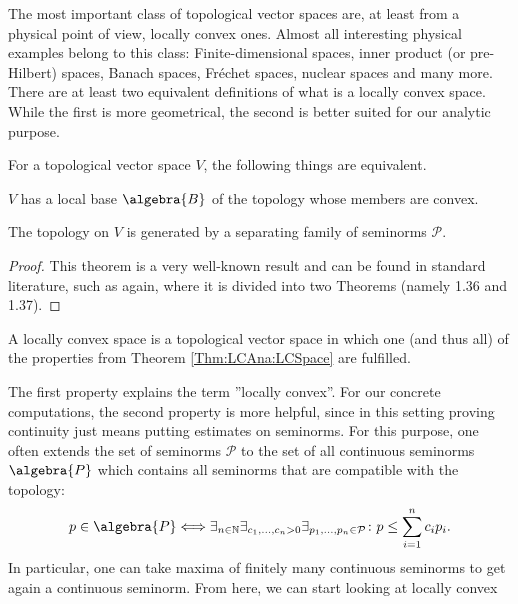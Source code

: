 The most important class of topological vector spaces are, at least from a 
physical point of view, locally convex ones. Almost all 
interesting physical examples belong to this class: Finite-dimensional spaces, 
inner product (or pre-Hilbert) spaces, Banach spaces, Fr\'echet spaces, 
nuclear spaces and many more. There are at least two equivalent 
definitions of what is a locally convex space. While the first is more 
geometrical, the second is better suited for our analytic purpose.
\begin{theorem}
	\label{Thm:LCAna:LCSpace}
	For a topological vector space $V$, the following things are equivalent.
	\begin{theoremlist}
		\item
		$V$ has a local base $\algebra{B}$ of the topology whose members are 
		convex.
		
		\item
		The topology on $V$ is generated by a separating family of seminorms 
		$\mathcal{P}$.
	\end{theoremlist}
\end{theorem}
\begin{proof}
	This theorem is a very well-known result and can be found in standard 
	literature, such as \cite{rudin:1991a} again, where it is divided into 
	two 	Theorems (namely 1.36 and 1.37).
\end{proof}
\begin{definition}
	\label{Def:LCSpace}
	A locally convex space is a topological vector space in which one (and 
	thus all) of the properties from Theorem \ref{Thm:LCAna:LCSpace} are 
	fulfilled.
\end{definition}
The first property explains the term ''locally convex''. 
For our concrete computations, the second property is more helpful, 
since in this setting proving continuity just means putting estimates on 
seminorms. For this purpose, one often extends the set of seminorms 
$\mathcal{P}$ to the set of all continuous seminorms $\algebra{P}$ which 
contains all seminorms that are compatible with the topology:
\begin{equation*}
	p \in \algebra{P}
	\Longleftrightarrow
	\exists_{n \in \mathbb{N}}
	\exists_{c_1, \ldots, c_n > 0}
	\exists_{p_1, \ldots, p_n \in \mathcal{P}}
	\colon
	p 
	\leq 
	\sum\limits_{i = 1}^n
	c_i p_i.
\end{equation*}
In particular, one can take maxima of finitely many continuous seminorms to get 
again a continuous seminorm. From here, we can start looking at locally convex 
